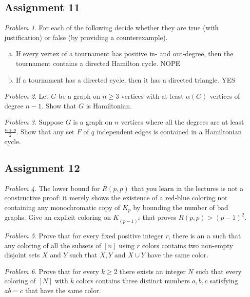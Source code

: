 \documentclass[10pt, fleqn, a4paper, landscape]{article}
\theoremstyle{plain} %
\theoremstyle{remark} %
\newtheorem{problem}{Problem}
\theoremstyle{definition} %
\begin{document}
\begin{multicols}{3}
\begin{tiny}
\subsection{Assignment 11}

\begin{problem}
For each of the following decide whether they are true (with justification) or false (by providing a counterexample).
\begin{enumerate}[(a)]
\item If every vertex of a tournament has positive in- and out-degree, then the tournament contains a directed Hamilton cycle. NOPE
\item If a tournament has a directed cycle, then it has a directed triangle. YES
\end{enumerate} 
\end{problem}

\begin{problem}
Let $G$ be a graph on $n \ge 3$ vertices with at least $\alpha(G)$ vertices of degree $n- 1$. Show that $G$ is Hamiltonian.
\end{problem}

\begin{problem}
Suppose $G$ is a graph on $n$ vertices where all the degrees are at least $\frac{n+q}{2}$. Show that any set $F$ of $q$ independent edges is contained in a Hamiltonian cycle.
\end{problem}

\subsection{Assignment 12}

\begin{problem}
The lower bound for $R(p, p)$ that you learn in the lectures is not a constructive proof: it merely shows the existence of a red-blue coloring not containing any monochromatic copy of $K_p$ by bounding the number of bad graphs. Give an explicit coloring on $K_{(p-1)^2}$ that proves $R(p, p) > (p - 1)^2$.
\end{problem}

\begin{problem}
Prove that for every fixed positive integer $r$, there is an $n$ such that any coloring of all the subsets of $[n] $ using $r$ colors contains two non-empty disjoint sets $X$ and $Y$ such that $X, Y $ and $X \cup Y$ have the same color.
\end{problem}

\begin{problem}
Prove that for every $k \ge 2$ there exists an integer $N$ such that every coloring of $[N]$ with $k$ colors contains three distinct numbers $a, b, c$ satisfying $ab = c$ that have the same color.
\end{problem}


\end{tiny}
\end{multicols}
\end{document}
